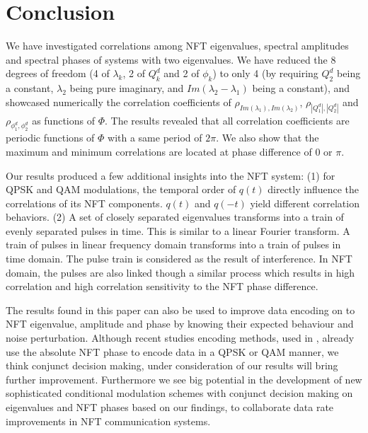 \documentclass[9pt,twocolumn,twoside]{osajnl}
\begin{document}
\section{Conclusion}
\label{sec:Conclusion}
We have investigated correlations among NFT eigenvalues, spectral amplitudes and spectral phases of systems with two eigenvalues. We have reduced the 8 degrees of freedom (4 of $\lambda_k$, 2 of $Q^d_k$ and 2 of $\phi_k$) to only 4 (by requiring $Q^d_2$ being a constant, $\lambda_2$ being pure imaginary, and $Im(\lambda_2 - \lambda_1)$ being a constant), and showcased numerically the correlation coefficients of $\rho_{Im(\lambda_1),Im(\lambda_2)}$, $\rho_{|Q^d_1|,|Q^d_2|}$ and $\rho_{\phi^d_1,\phi^d_2}$ as functions of $\Phi$. The results revealed that all correlation coefficients are periodic functions of $\Phi$ with a same period of $2\pi$. We also show that the maximum and minimum correlations are located at phase difference of $0$ or $\pi$.

Our results produced a few additional insights into the NFT system: (1) for QPSK and QAM modulations, the temporal order of $q(t)$ directly influence the correlations of its NFT components. $q(t)$ and $q(-t)$ yield different correlation behaviors. (2) A set of closely separated eigenvalues transforms into a train of evenly separated pulses in time. This is similar to a linear Fourier transform. A train of pulses in linear frequency domain transforms into a train of pulses in time domain. The pulse train is considered as the result of interference. In NFT domain, the pulses are also linked though a similar process which results in high correlation and high correlation sensitivity to the NFT phase difference.

The results found in this paper can also be used to improve data encoding on to NFT eigenvalue, amplitude and phase by knowing their expected behaviour and noise perturbation. Although recent studies encoding methods, used in \cite{aref_experimental_2015, bulow_experimental_2016, gui_alternative_2017, gui_4_2017}, already use the absolute NFT phase to encode data in a QPSK or QAM manner, we think conjunct decision making, under consideration of our results will bring further improvement. Furthermore we see big potential in the development of new sophisticated conditional modulation schemes with conjunct decision making on eigenvalues and NFT phases based on our findings, to collaborate data rate improvements in NFT communication systems. 
\end{document}
